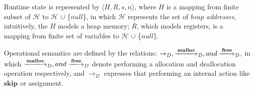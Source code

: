 \documentclass[english]{jssst_ppl} %
\newcommand\SKIP{\mathbf{skip}}
\newcommand\Malloc{\mathbf{malloc}}
\newcommand\Free{\mathbf{free}}
\theoremstyle{definition}
\begin{document}
Runtime state is represented by $\langle H, R, s, n \rangle$, where $H$ is a mapping from finite subset of $\mathcal{H}$ to $\mathcal{H}$ $\cup$ \{$null$\}, in which $\mathcal{H}$ represents the set of \emph{heap addresses}, intuitively, the $H$ models a heap memory; $R$, which models registers, is a mapping from finite set of variables to $\mathcal{H}$ $\cup$ \{$null$\}.

Operational semantics are defined by the relations: $\rightarrow_{D}, \xlongrightarrow{\Malloc}_{D}, and \xlongrightarrow{\Free}_{D} $, in which $\xlongrightarrow{\Malloc}_{D}, and \xlongrightarrow{\Free}_{D} $ denote performing a allocation and deallocation operation respectively, and $\rightarrow_{D}$ expresses that performing an internal action like $\SKIP$ or assignment.
\end{document}

